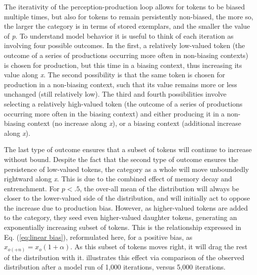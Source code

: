 The iterativity of the perception-production loop allows for tokens
to be biased multiple times, but also for tokens to remain persistently
non-biased, the more so, the larger the category is in terms of stored
exemplars, and the smaller the value of \emph{p}. To understand model
behavior it is useful to think of each iteration as involving four
possible outcomes. In the first, a relatively low-valued token (the
outcome of a series of productions occurring more often in non-biasing
contexts) is chosen for production, but this time in a biasing context,
thus increasing its value along \emph{x}. The second possibility is
that the same token is chosen for production in a non-biasing context,
such that its value remains more or less unchanged (still relatively
low). The third and fourth possibilities involve selecting a relatively
high-valued token (the outcome of a series of productions occurring
more often in the biasing context) and either producing it in a non-biasing
context (no increase along \emph{x}), or a biasing context (additional
increase along \emph{x}). 

The last type of outcome ensures that a subset of tokens will continue
to increase without bound. Despite the fact that the second type of
outcome ensures the persistence of low-valued tokens, the category
as a whole will move unboundedly rightward along \emph{x}. This is
due to the combined effect of memory decay and entrenchment. For $p<.5$,
the over-all mean of the distribution will always be closer to the
lower-valued side of the distribution, and will initially act to oppose
the increase due to production bias. However, as higher-valued tokens
are added to the category, they seed even higher-valued daughter tokens,
generating an exponentially increasing subset of tokens. This is the
relationship expressed in Eq. (\ref{eq:linear bias}), reformulated
here, for a positive bias, as $x_{o(+n)}=x_{o}(1+\alpha)$. As this
subset of tokens moves right, it will drag the rest of the distribution
with it.  illustrates this effect
via comparison of the observed distribution after a model run of 1,000
iterations, versus 5,000 iterations.

